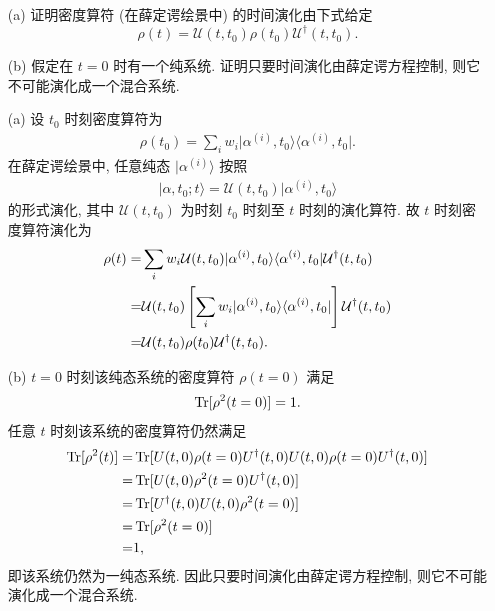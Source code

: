 \documentclass{assignment}
\begin{document}
\begin{prob}[课本习题 3.11]
    \begin{itemize}
        \item[(a)] 证明密度算符 (在薛定谔绘景中) 的时间演化由下式给定
        \[
            \rho(t)=\mathcal{U}(t,t_0)\rho(t_0)\mathcal{U}^{\dagger}(t,t_0).
        \]
        \item[(b)] 假定在 $t=0$ 时有一个纯系统. 证明只要时间演化由薛定谔方程控制, 则它不可能演化成一个混合系统.
    \end{itemize}
\end{prob}
\begin{pf}
    \begin{itemize}
        \item[(a)] 设 $t_0$ 时刻密度算符为
        \begin{align}
            \rho(t_0)=\sum_iw_i\lvert\alpha^{(i)},t_0\rangle\langle\alpha^{(i)},t_0\rvert.
        \end{align}
        在薛定谔绘景中, 任意纯态 $\lvert\alpha^{(i)}\rangle$ 按照
        \begin{align}
            \lvert\alpha,t_0;t\rangle=\mathcal{U}(t,t_0)\lvert\alpha^{(i)},t_0\rangle
        \end{align}
        的形式演化, 其中 $\mathcal{U}(t,t_0)$ 为时刻 $t_0$ 时刻至 $t$ 时刻的演化算符.
        故 $t$ 时刻密度算符演化为
        \begin{align}
            \notag\rho(t)=&\sum_iw_i\mathcal{U}(t,t_0)\lvert\alpha^{(i)},t_0\rangle\langle\alpha^{(i)},t_0\rvert\mathcal{U}^{\dagger}(t,t_0)\\
            \notag=&\mathcal{U}(t,t_0)\left[\sum_iw_i\lvert\alpha^{(i)},t_0\rangle\langle\alpha^{(i)},t_0\rvert\right]\mathcal{U}^{\dagger}(t,t_0)\\
            =&\mathcal{U}(t,t_0)\rho(t_0)\mathcal{U}^{\dagger}(t,t_0).
        \end{align}
        \item[(b)] $t=0$ 时刻该纯态系统的密度算符 $\rho(t=0)$ 满足
        \begin{align}
            \operatorname{Tr}[\rho^2(t=0)]=1.
        \end{align}
        任意 $t$ 时刻该系统的密度算符仍然满足
        \begin{align}
            \notag\operatorname{Tr}[\rho^2(t)]=&\operatorname{Tr}[U(t,0)\rho(t=0)U^{\dagger}(t,0)U(t,0)\rho(t=0)U^{\dagger}(t,0)]\\
            \notag=&\operatorname{Tr}[U(t,0)\rho^2(t=0)U^{\dagger}(t,0)]\\
            \notag=&\operatorname{Tr}[U^{\dagger}(t,0)U(t,0)\rho^2(t=0)]\\
            \notag=&\operatorname{Tr}[\rho^2(t=0)]\\
            =&1,
        \end{align}
        即该系统仍然为一纯态系统.
        因此只要时间演化由薛定谔方程控制, 则它不可能演化成一个混合系统.
    \end{itemize}
\end{pf}
\end{document}
